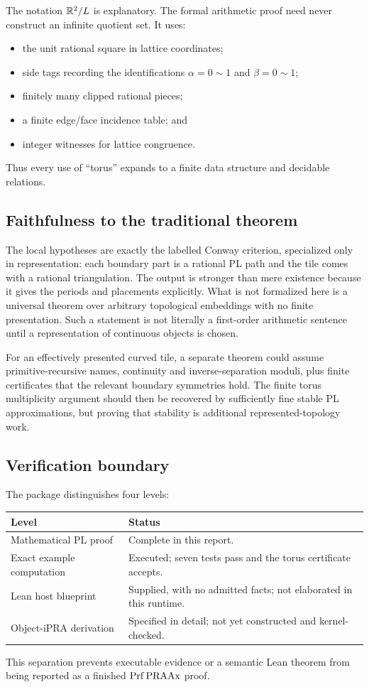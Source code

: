 The notation \(\mathbb R^2/L\) is explanatory.  The formal arithmetic proof need never construct an infinite quotient set.  It uses:
\begin{itemize}
\item the unit rational square in lattice coordinates;
\item side tags recording the identifications \(\alpha=0\sim1\) and \(\beta=0\sim1\);
\item finitely many clipped rational pieces;
\item a finite edge/face incidence table; and
\item integer witnesses for lattice congruence.
\end{itemize}
Thus every use of ``torus'' expands to a finite data structure and decidable relations.

\subsection{Faithfulness to the traditional theorem}

The local hypotheses are exactly the labelled Conway criterion, specialized only in representation: each boundary part is a rational PL path and the tile comes with a rational triangulation.  The output is stronger than mere existence because it gives the periods and placements explicitly.  What is not formalized here is a universal theorem over arbitrary topological embeddings with no finite presentation.  Such a statement is not literally a first-order arithmetic sentence until a representation of continuous objects is chosen.

For an effectively presented curved tile, a separate theorem could assume primitive-recursive names, continuity and inverse-separation moduli, plus finite certificates that the relevant boundary symmetries hold.  The finite torus multiplicity argument should then be recovered by sufficiently fine stable PL approximations, but proving that stability is additional represented-topology work.

\subsection{Verification boundary}

The package distinguishes four levels:
\begin{center}
\begin{tabular}{@{}p{}p{}@{}}
\toprule
Level & Status \\
\midrule
Mathematical PL proof & Complete in this report. \\
Exact example computation & Executed; seven tests pass and the torus certificate accepts. \\
Lean host blueprint & Supplied, with no admitted facts; not elaborated in this runtime. \\
Object-iPRA derivation & Specified in detail; not yet constructed and kernel-checked. \\
\bottomrule
\end{tabular}
\end{center}
This separation prevents executable evidence or a semantic Lean theorem from being reported as a finished \(\mathrm{Prf}\,\mathrm{PRAAx}\) proof.
